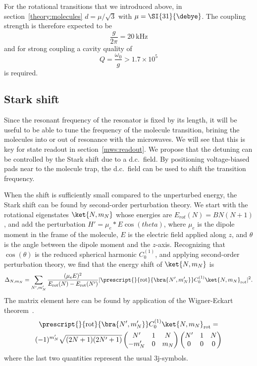 For the rotational \CaF{} transitions that we introduced above, in
section~\ref{theory:molecules} $d = \mu/\sqrt{3}$ with $\mu =
\SI{31}{\debye}$.
%
The coupling strength is therefore expected to be
%
\begin{equation}
  \frac{g}{2\pi} = \SI{20}{\kilo\hertz}
\end{equation}
%
and for strong coupling a cavity quality of
%
\begin{equation}
  Q = \frac{\omega_0}{g} > 1.7 \times 10^5
\end{equation}
%
is required.

\subsection{Stark shift}

Since the resonant frequency of the resonator is fixed by its length, it will
be useful to be able to tune the frequency of the molecule transition, 
brining the molecules into or out of resonance with the microwaves. We will
see that this is key for state readout in section~\ref{mws:readout}. We propose
that the detuning can be controlled by the Stark shift due to a d.c.~field.  By
positioning voltage-biased pads near to the molecule trap, the d.c.~field can
be used to shift the transition frequency.

When the shift is sufficiently small compared to the unperturbed energy, the
Stark shift can be found by second-order perturbation theory.
%
We start with the rotational eigenstates $\ket{N,m_N}$ whose energies are
$E_{rot}(N)=B N(N+1)$, and add the perturbation $H'=\mu_e*E \cos(theta)$, where
$\mu_e$ is the dipole moment in the frame of the molecule, $E$ is the electric
field applied along $z$, and $\theta$ is the angle between the dipole moment
and the $z$-axis. Recognizing that $\cos(\theta)$ is the reduced spherical
harmonic $C^{(1)}_0$, and applying second-order perturbation theory, we find
that the energy shift of $\ket{N,m_N}$ is
%
\begin{equation}
  \Delta_{N, m_N} = \sum_{N', m_N'} \frac{(\mu_e E)^2}{E_\text{rot}(N) -
  E_\text{rot}(N')} |\prescript{}{\text{rot}}{\bra{N', m_N'}}C_0^{(1)} \ket{N,
m_N}_\text{rot}|^2.
\label{mws:eqn:Stark}
\end{equation}
%
The matrix element here can be found by application of the Wigner-Eckart
theorem~\cite{edmonds1996}.
%
\begin{multline} \prescript{}{\text{rot}}{\bra{N', m_N'}}C_0^{(1)} \ket{N, m_N}_\text{rot} =
  \\ (-1)^{m_N'}\sqrt{(2N+1)(2N'+1)}
  \begin{pmatrix} N' & 1 & N \\ -m_N' & 0 & m_N \end{pmatrix} \begin{pmatrix}
N' & 1 & N \\ 0 & 0 & 0 \end{pmatrix}
\end{multline}
%
where the last two quantities represent the usual 3j-symbols.


